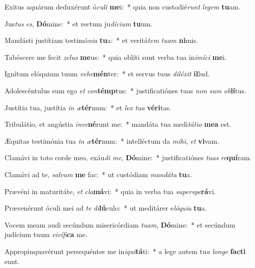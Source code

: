 \item Exitus aquárum deduxérunt ó\textit{cu}\textit{li} \textbf{me}i:~* quia non custodié\textit{runt} \textit{le}\textit{gem} \textbf{tu}am.
\item Jus\textit{tus} \textit{es}, \textbf{Dó}mine:~* et rectum ju\textit{dí}\textit{ci}\textit{um} \textbf{tu}um.
\item Mandásti justítiam testimó\textit{ni}\textit{a} \textbf{tu}a:~* et veritá\textit{tem} \textit{tu}\textit{am} \textbf{ni}mis.
\item Tabéscere me fecit \textit{ze}\textit{lus} \textbf{me}us:~* quia oblíti sunt verba tua in\textit{i}\textit{mí}\textit{ci} \textbf{me}i.
\item Ignítum elóquium tuum \textit{ve}\textit{he}\textbf{mén}ter:~* et servus tuus \textit{di}\textit{lé}\textit{xit} \textbf{il}lud.
\item Adolescéntulus sum ego \textit{et} \textit{con}\textbf{témp}tus:~* justificatiónes tuas \textit{non} \textit{sum} \textit{ob}\textbf{lí}tus.
\item Justítia tua, justítia \textit{in} \textit{æ}\textbf{tér}num:~* et \textit{lex} \textit{tu}\textit{a} \textbf{vé}\textbf{ri}tas.
\item Tribulátio, et angústia \textit{in}\textit{ve}\textbf{né}runt me:~* mandáta tua medi\textit{tá}\textit{ti}\textit{o} \textbf{me}\textbf{a} est.
\item Æquitas testimónia tua \textit{in} \textit{æ}\textbf{tér}num:~* intelléctum da \textit{mi}\textit{hi}, \textit{et} \textbf{vi}vam.
\item Clamávi in toto corde meo, exáu\textit{di} \textit{me}, \textbf{Dó}mine:~* justificatiónes \textit{tu}\textit{as} \textit{re}\textbf{quí}ram.
\item Clamávi ad te, \textit{sal}\textit{vum} \textbf{me} fac:~* ut custódiam \textit{man}\textit{dá}\textit{ta} \textbf{tu}a.
\item Prævéni in maturitáte, \textit{et} \textit{cla}\textbf{má}vi:~* quia in verba tua \textit{su}\textit{per}\textit{spe}\textbf{rá}vi.
\item Prævenérunt óculi mei ad \textit{te} \textit{di}\textbf{lú}culo:~* ut meditárer e\textit{ló}\textit{qui}\textit{a} \textbf{tu}a.
\item Vocem meam audi secúndum misericórdiam \textit{tu}\textit{am}, \textbf{Dó}mine:~* et secúndum judícium tuum \textit{vi}\textit{ví}\textit{fi}\textbf{ca} me.
\item Appropinquavérunt persequéntes me in\textit{i}\textit{qui}\textbf{tá}ti:~* a lege autem tu\textit{a} \textit{lon}\textit{ge} \textbf{fac}\textbf{ti} sunt.
